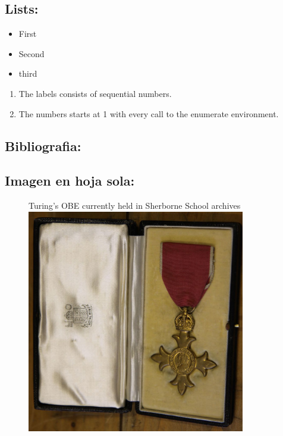 \documentclass{article}
\begin{document}
  \subsection{Lists:}
    \begin{itemize}
      \item{First}
      \item{Second}
      \item{third}
    \end{itemize}
    \begin{enumerate}
      \item The labels consists of sequential numbers.
      \item The numbers starts at 1 with every call to the enumerate environment.
    \end{enumerate}
  \subsection{Bibliografia:}
    \printbibliography
  \subsection{Imagen en hoja sola:}
    \pagebreak

    \begin{figure}
      Turing's OBE currently held in Sherborne School archives
      \centering
      \includegraphics[width=0.85\textwidth]{OBE}
    \end{figure}
\end{document}

